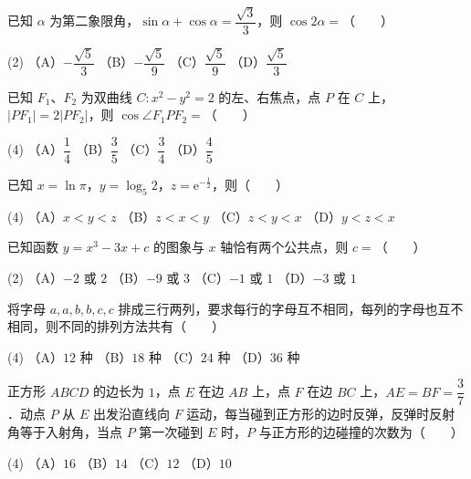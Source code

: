 \begin{question}
已知 $\alpha$ 为第二象限角，$\sin\alpha+\cos\alpha=\dfrac{\sqrt3}{3}$，则 $\cos2\alpha=$\mbox{（　　）}

\begin{gkopts}(2)
\task （A）$-\dfrac{\sqrt5}{3}$
\task （B）$-\dfrac{\sqrt5}{9}$
\task （C）$\dfrac{\sqrt5}{9}$
\task （D）$\dfrac{\sqrt5}{3}$
\end{gkopts}

\end{question}
\begin{question}
已知 $F_1\text{、}F_2$ 为双曲线 $C:x^2-y^2=2$ 的左、右焦点，点 $P$ 在 $C$ 上，$|PF_1|=2|PF_2|$，则 $\cos\angle F_1PF_2=$\mbox{（　　）}

\begin{gkopts}(4)
\task （A）$\dfrac14$
\task （B）$\dfrac35$
\task （C）$\dfrac34$
\task （D）$\dfrac45$
\end{gkopts}

\end{question}
\begin{question}
已知 $x=\ln\pi$，$y=\log_5 2$，$z=\mathrm e^{-\frac12}$，则\mbox{（　　）}

\begin{gkopts}(4)
\task （A）$x<y<z$
\task （B）$z<x<y$
\task （C）$z<y<x$
\task （D）$y<z<x$
\end{gkopts}

\end{question}
\begin{question}
已知函数 $y=x^3-3x+c$ 的图象与 $x$ 轴恰有两个公共点，则 $c=$\mbox{（　　）}

\begin{gkopts}(2)
\task （A）$-2$ 或 $2$
\task （B）$-9$ 或 $3$
\task （C）$-1$ 或 $1$
\task （D）$-3$ 或 $1$
\end{gkopts}

\end{question}
\begin{question}
将字母 $a,a,b,b,c,c$ 排成三行两列，要求每行的字母互不相同，每列的字母也互不相同，则不同的排列方法共有\mbox{（　　）}

\begin{gkopts}(4)
\task （A）$12$ 种
\task （B）$18$ 种
\task （C）$24$ 种
\task （D）$36$ 种
\end{gkopts}

\end{question}
\begin{question}
正方形 $ABCD$ 的边长为 $1$，点 $E$ 在边 $AB$ 上，点 $F$ 在边 $BC$ 上，$AE=BF=\dfrac37$．动点 $P$ 从 $E$ 出发沿直线向 $F$ 运动，每当碰到正方形的边时反弹，反弹时反射角等于入射角，当点 $P$ 第一次碰到 $E$ 时，$P$ 与正方形的边碰撞的次数为\mbox{（　　）}

\begin{gkopts}(4)
\task （A）$16$
\task （B）$14$
\task （C）$12$
\task （D）$10$
\end{gkopts}

\end{question}

